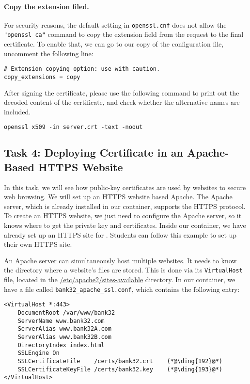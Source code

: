 \paragraph{Copy the extension filed.}
For security reasons, the default setting in \texttt{openssl.cnf} does not allow
the \texttt{"openssl ca"} command to copy the extension field 
from the request to the final certificate. To enable that, we 
can go to our copy of the configuration file,
uncomment the following line: 

\begin{lstlisting}
# Extension copying option: use with caution.
copy_extensions = copy
\end{lstlisting}
 

After signing the certificate, please use the following command to print out 
the decoded content of the certificate, and check whether the 
alternative names are included.

\begin{lstlisting}
openssl x509 -in server.crt -text -noout 
\end{lstlisting}


\subsection{Task 4: Deploying Certificate in an Apache-Based HTTPS Website}

In this task, we will see how public-key certificates 
are used by websites to secure web browsing. We will set up
an HTTPS website based Apache.  The Apache server, which is already 
installed in our container, supports the HTTPS protocol. 
To create an HTTPS website, we just need to 
configure the Apache server, so it knows where to get the private key and certificates. 
Inside our container, we have already set up an HTTPS site for \pkiserver. 
Students can follow this example to set up their own HTTPS site.

An Apache server can simultaneously host multiple websites. It needs to know
the directory where a website's files are stored. This is done via its 
\texttt{VirtualHost} file, located in the \url{/etc/apache2/sites-available}
directory. In our container, we have a file called
\texttt{bank32\_apache\_ssl.conf}, which contains the following entry:

\begin{lstlisting}
<VirtualHost *:443>
    DocumentRoot /var/www/bank32
    ServerName www.bank32.com
    ServerAlias www.bank32A.com
    ServerAlias www.bank32B.com
    DirectoryIndex index.html
    SSLEngine On
    SSLCertificateFile    /certs/bank32.crt    (*@\ding{192}@*)
    SSLCertificateKeyFile /certs/bank32.key    (*@\ding{193}@*)
</VirtualHost>
\end{lstlisting}

